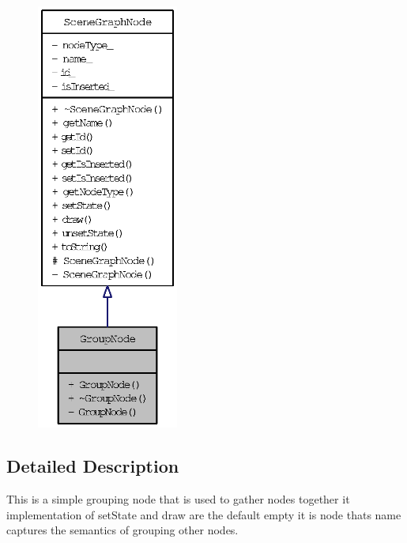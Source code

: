 \begin{figure}[H]
\begin{center}
\leavevmode
\includegraphics[height=400pt]{classGroupNode__coll__graph}
\end{center}
\end{figure}


\subsection{Detailed Description}
This is a simple grouping node that is used to gather nodes together it implementation of setState and draw are the default empty it is node thats name captures the semantics of grouping other nodes. 

